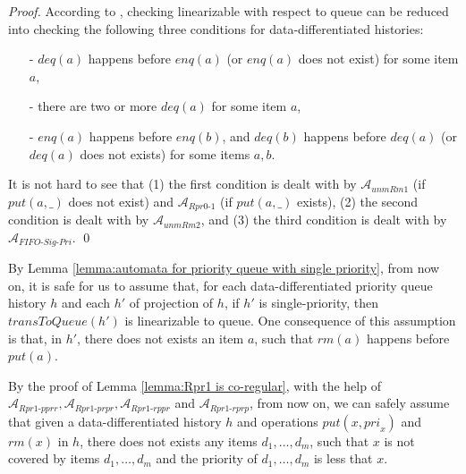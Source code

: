 \begin {proof}

According to \cite{Bouajjani:2015}, checking linearizable with respect to queue can be reduced into checking the following three conditions for data-differentiated histories:

\begin{itemize}
\setlength{\itemsep}{0.5pt}
\item[-] $\textit{deq}(a)$ happens before $\textit{enq}(a)$ (or $\textit{enq}(a)$ does not exist) for some item $a$,

\item[-] there are two or more $\textit{deq}(a)$ for some item $a$,

\item[-] $\textit{enq}(a)$ happens before $\textit{enq}(b)$, and $\textit{deq}(b)$ happens before $\textit{deq}(a)$ (or $\textit{deq}(a)$ does not exists) for some items $a,b$.
\end{itemize}

It is not hard to see that (1) the first condition is dealt with by $\mathcal{A}_{\textit{unmRm1}}$ (if $\textit{put}(a,\_)$ does not exist) and $\mathcal{A}_{\textit{Rpr0-1}}$ (if $\textit{put}(a,\_)$ exists), (2) the second condition is dealt with by $\mathcal{A}_{\textit{unmRm2}}$, and (3) the third condition is dealt with by $\mathcal{A}_{\textit{FIFO-Sig-Pri}}$. \qed
\end {proof}

By Lemma \ref{lemma:automata for priority queue with single priority}, from now on, it is safe for us to assume that, for each data-differentiated priority queue history $h$ and each $h'$ of projection of $h$, if $h'$ is single-priority, then $\textit{transToQueue}(h')$ is linearizable to queue. One consequence of this assumption is that, in $h'$, there does not exists an item $a$, such that $\textit{rm}(a)$ happens before $\textit{put}(a)$.

By the proof of Lemma \ref{lemma:Rpr1 is co-regular}, with the help of $\mathcal{A}_{\textit{Rpr1-pprr}}, \mathcal{A}_{\textit{Rpr1-prpr}}, \mathcal{A}_{\textit{Rpr1-rppr}}$ and $\mathcal{A}_{\textit{Rpr1-rprp}}$, from now on, we can safely assume that given a data-differentiated history $h$ and operations $\textit{put}(x,\textit{pri}_x)$ and $\textit{rm}(x)$ in $h$, there does not exists any items $d_1,\ldots,d_m$, such that $x$ is not covered by items $d_1,\ldots,d_m$ and the priority of $d_1,\ldots,d_m$ is less that $x$.


